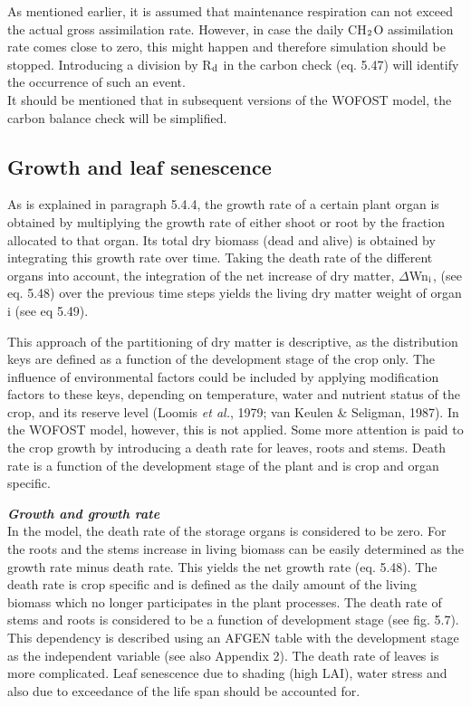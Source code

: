 As mentioned earlier, it is assumed that maintenance respiration can not exceed the actual
gross assimilation rate. However, in case the daily CH$_{{\rm 2}}$O assimilation rate comes close to
zero, this might happen and therefore simulation should be stopped. Introducing a
division by R$_{{\rm d}}$ in the carbon check (eq. 5.47) will identify the occur\-rence of such an
event.\\
It should be mentioned that in subsequent versions of the WOFOST model, the carbon
balance check will be simplified.




\subsection{Growth and leaf senescence  }

As is explained in paragraph 5.4.4, the growth rate of a certain plant organ is obtained by
multi\-plying the growth rate of either shoot or root by the fraction allocated to that organ.
Its total dry biomass (dead and alive) is obtained by integrating this growth rate over
time. Taking the death rate of the different organs into account, the integration of the net
increase of dry matter, $\Delta$Wn$_{{\rm i}}$, (see eq. 5.48) over the previous time steps yields the living
dry matter weight of organ i (see eq 5.49).

This approach of the partitioning of dry mat\-ter is descriptive, as the distribution keys are
defined as a function of the development stage of the crop only. The influence of
environmental factors could be included by applying modification factors to these keys,
depending on temperature, water and nutrient status of the crop, and its reserve level
(Loomis {\it et al.\/}, 1979; van Keulen \& Seligman, 1987). In the WOFOST model, however,
this is not applied. Some more attention is paid to the crop growth by introducing a death
rate for leaves, roots and stems. Death rate is a function of the development stage of the
plant and is crop and organ specific.



{\bf {\it Growth and growth rate\/}}\\
In the model, the death rate of the storage organs is considered to be zero. For the roots
and the stems increase in living biomass can be easily determined as the growth rate
minus death rate. This yields the net growth rate (eq. 5.48). The death rate is crop
specific and is defined as the daily amount of the living biomass which no longer
participates in the plant processes. The death rate of stems and roots is considered to be a
function of development stage (see fig. 5.7). This dependency is described using an
AFGEN table with the development stage as the independent variable (see also Appendix
2). The death rate of leaves is more complicat\-ed. Leaf senescence due to shading (high
LAI), water stress and also due to exceedance of the life span should be accounted for.







